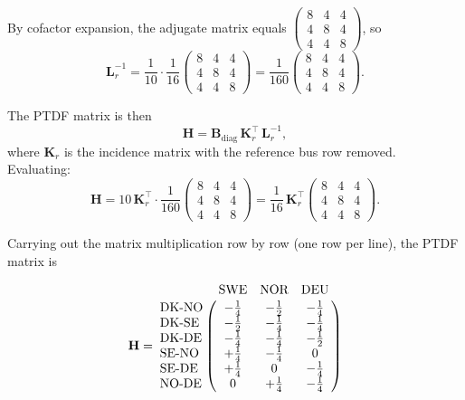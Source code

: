 By cofactor expansion, the adjugate matrix equals $\begin{pmatrix}8&4&4\\4&8&4\\4&4&8\end{pmatrix}$, so
\begin{equation}
\mathbf{L}_r^{-1} = \frac{1}{10} \cdot \frac{1}{16}
\begin{pmatrix}8&4&4\\4&8&4\\4&4&8\end{pmatrix}
= \frac{1}{160}
\begin{pmatrix}8&4&4\\4&8&4\\4&4&8\end{pmatrix}.
\end{equation}

The PTDF matrix is then
\begin{equation}
    \mathbf{H} = \mathbf{B}_\text{diag}\,\mathbf{K}_r^\top\,\mathbf{L}_r^{-1},
\end{equation}
where $\mathbf{K}_r$ is the incidence matrix with the reference bus row removed. Evaluating:
\begin{equation}
\mathbf{H} = 10\,\mathbf{K}_r^\top \cdot \frac{1}{160}
\begin{pmatrix}8&4&4\\4&8&4\\4&4&8\end{pmatrix}
= \frac{1}{16}\,\mathbf{K}_r^\top
\begin{pmatrix}8&4&4\\4&8&4\\4&4&8\end{pmatrix}.
\end{equation}

Carrying out the matrix multiplication row by row (one row per line), the PTDF matrix is

\begin{equation}
\mathbf{H} =
\bordermatrix{
               & \text{SWE} & \text{NOR} & \text{DEU} \cr
\text{DK-NO}  & -\tfrac{1}{4} & -\tfrac{1}{2} & -\tfrac{1}{4} \cr
\text{DK-SE}  & -\tfrac{1}{2} & -\tfrac{1}{4} & -\tfrac{1}{4} \cr
\text{DK-DE}  & -\tfrac{1}{4} & -\tfrac{1}{4} & -\tfrac{1}{2} \cr
\text{SE-NO}  & +\tfrac{1}{4} & -\tfrac{1}{4} &  0            \cr
\text{SE-DE}  & +\tfrac{1}{4} &  0            & -\tfrac{1}{4} \cr
\text{NO-DE}  &  0            & +\tfrac{1}{4} & -\tfrac{1}{4} \cr
}
\end{equation}

